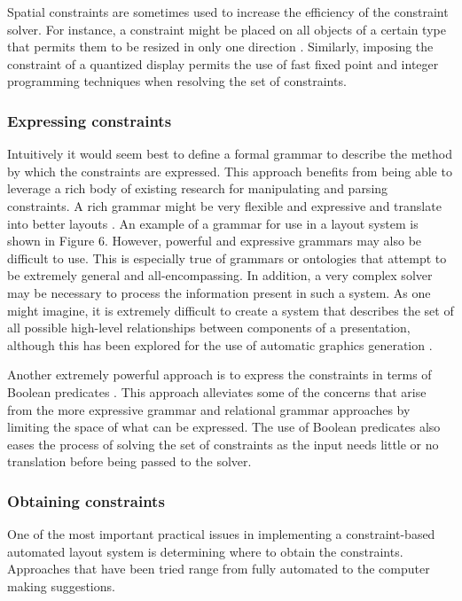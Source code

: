       Spatial constraints are sometimes used to increase the efficiency of the
      constraint solver. For instance, a constraint might be placed on all
      objects of a certain type that permits them to be resized in only one
      direction \citep{linton-1}. Similarly, imposing the constraint of a
      quantized display permits the use of fast fixed point and integer
      programming techniques when resolving the set of constraints.

    \subsubsection{Expressing constraints}

     Intuitively it would seem best to define a formal grammar to describe the
     method by which the constraints are expressed. This approach benefits from
     being able to leverage a rich body of existing research for manipulating
     and parsing constraints. A rich grammar might be very flexible and
     expressive and translate into better layouts \citep{weitzman-1}. An example
     of a grammar for use in a layout system is shown in Figure 6. However,
     powerful and expressive grammars may also be difficult to use. This is
     especially true of grammars or ontologies that attempt to be extremely
     general and all-encompassing. In addition, a very complex solver may be
     necessary to process the information present in such a system. As one might
     imagine, it is extremely difficult to create a system that describes the
     set of all possible high-level relationships between components of a
     presentation, although this has been explored for the use of automatic
     graphics generation \citep{zhou-1}.

     Another extremely powerful approach is to express the constraints in terms
     of Boolean predicates \citep{graf-1}. This approach alleviates some of the
     concerns that arise from the more expressive grammar and relational grammar
     approaches by limiting the space of what can be expressed. The use of
     Boolean predicates also eases the process of solving the set of constraints
     as the input needs little or no translation before being passed to the
     solver.

    \subsubsection{Obtaining constraints}

     One of the most important practical issues in implementing a
     constraint-based automated layout system is determining where to obtain the
     constraints. Approaches that have been tried range from fully automated to
     the computer making suggestions.

